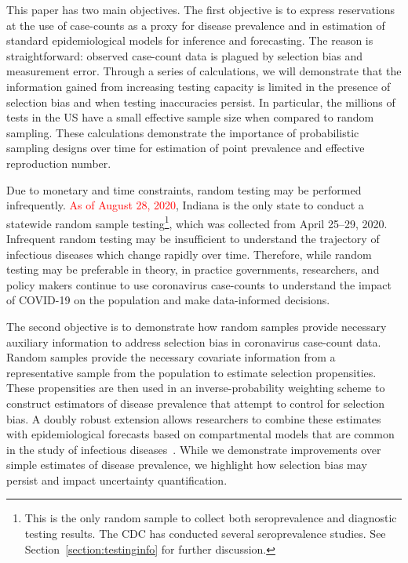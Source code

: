 \documentclass[12pt]{amsart}
\numberwithin{equation}{section}
\theoremstyle{plain}
\begin{document}
This paper has two main objectives.  The first objective is to express reservations at the use of case-counts as a proxy for disease prevalence and in estimation of standard epidemiological models for inference and forecasting.  The reason is straightforward: observed case-count data is plagued by selection bias and measurement error. Through a series of calculations, we will demonstrate that the information gained from increasing testing capacity is limited in the presence of selection bias and when testing inaccuracies persist.  In particular, the millions of tests in the US have a small effective sample size when compared to random sampling. These calculations demonstrate the importance of probabilistic sampling designs  over time for estimation of point prevalence and effective reproduction number.

Due to monetary and time constraints, random testing may be performed infrequently.  \textcolor{red}{As of August 28, 2020}, Indiana is the only state to conduct a statewide random sample testing\footnote{This is the only random sample to collect both seroprevalence and diagnostic testing results. The CDC has conducted several seroprevalence studies. See Section~\ref{section:testinginfo} for further discussion.}, which was collected from April 25--29, 2020.  Infrequent random testing may be insufficient to understand the trajectory of infectious diseases which change rapidly over time.  Therefore, while random testing may be preferable in theory, in practice governments, researchers, and policy makers continue to use coronavirus case-counts to understand the impact of COVID-19 on the population and make data-informed decisions.

The second objective is to demonstrate how random samples provide necessary auxiliary information to address selection bias in coronavirus case-count data.  Random samples provide the necessary covariate information from a representative sample from the population to estimate selection propensities. These propensities are then used in an inverse-probability weighting scheme to construct estimators of disease prevalence that attempt to control for selection bias.  A doubly robust extension allows researchers to combine these estimates with epidemiological forecasts based on compartmental models that are common in the study of infectious diseases~\cite{Hao2020,Song2020,Ray2020,Johndrow2020}.
While we demonstrate improvements over simple estimates of disease prevalence, we highlight how selection bias may persist and impact uncertainty quantification.
\end{document}
